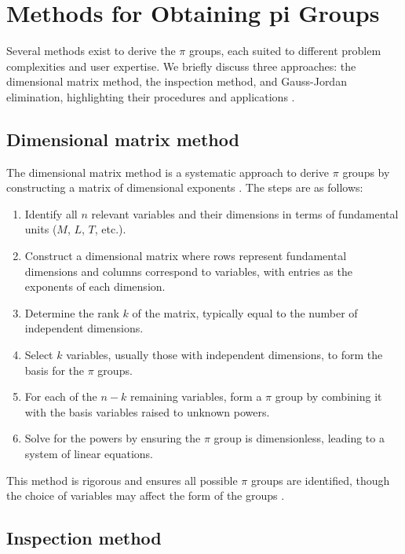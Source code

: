\section{Methods for Obtaining pi Groups}
\label{sec:methods}

Several methods exist to derive the $\pi$ groups, each suited to different problem complexities and user expertise. We briefly discuss three approaches: the dimensional matrix method, the inspection method, and Gauss-Jordan elimination, highlighting their procedures and applications \cite{Szirtes2007, white2011}.

\subsection{Dimensional matrix method}
\label{subsec:matrix}

The dimensional matrix method is a systematic approach to derive $\pi$ groups by constructing a matrix of dimensional exponents \cite{Szirtes2007}. The steps are as follows:
\begin{enumerate}
    \item Identify all $n$ relevant variables and their dimensions in terms of fundamental units ($M$, $L$, $T$, etc.).
    \item Construct a dimensional matrix where rows represent fundamental dimensions and columns correspond to variables, with entries as the exponents of each dimension.
    \item Determine the rank $k$ of the matrix, typically equal to the number of independent dimensions.
    \item Select $k$ variables, usually those with independent dimensions, to form the basis for the $\pi$ groups.
    \item For each of the $n - k$ remaining variables, form a $\pi$ group by combining it with the basis variables raised to unknown powers.
    \item Solve for the powers by ensuring the $\pi$ group is dimensionless, leading to a system of linear equations.
\end{enumerate}
This method is rigorous and ensures all possible $\pi$ groups are identified, though the choice of variables may affect the form of the groups \cite{Sonin2004}.

\subsection{Inspection method}
\label{subsec:inspection}

